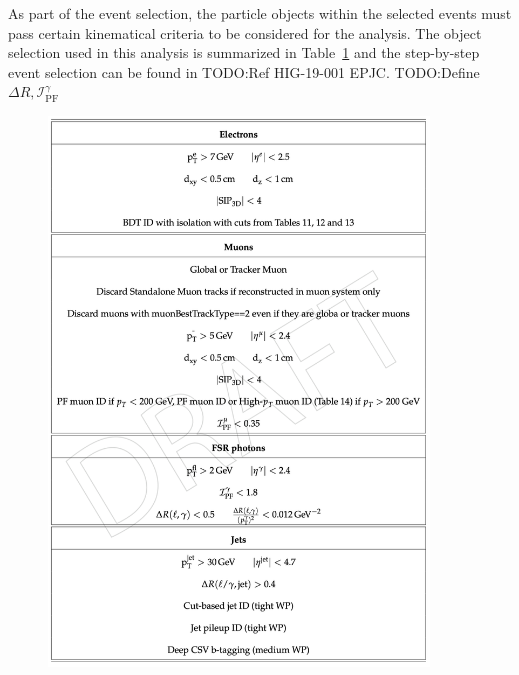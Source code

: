 As part of the event selection, the particle objects within the selected events must pass certain kinematical criteria to be considered for the analysis.
The object selection used in this analysis is summarized in Table~\ref{table:obj_sel_higgs} and the step-by-step event selection can be found in TODO:Ref HIG-19-001 EPJC.
TODO:Define $\Delta R, \mathcal{I}^\gamma_{\text{PF}}$
\begin{figure}
    \centering
    \includegraphics[width=0.90\textwidth]{figures/higgsmassmeas/table_objsel_hzz4l.png}
    \label{table:obj_sel_higgs}
\end{figure}


